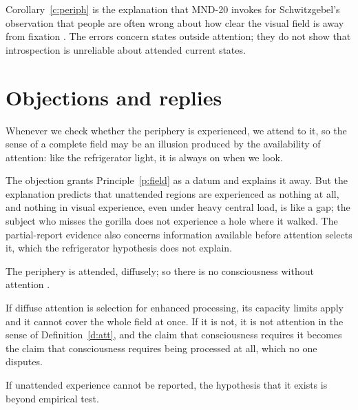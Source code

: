 \documentclass{situationist-preprint}
\begin{document}
Corollary~\ref{c:periph} is the explanation that MND-20 invokes for Schwitzgebel's observation that people are often wrong about how clear the visual field is away from fixation \citep{Schwitzgebel2008}. The errors concern states outside attention; they do not show that introspection is unreliable about attended current states.

\section{Objections and replies}

\begin{objection}\label{o:fridge}
Whenever we check whether the periphery is experienced, we attend to it, so the sense of a complete field may be an illusion produced by the availability of attention: like the refrigerator light, it is always on when we look.
\end{objection}

\begin{reply}
The objection grants Principle~\ref{p:field} as a datum and explains it away. But the explanation predicts that unattended regions are experienced as nothing at all, and nothing in visual experience, even under heavy central load, is like a gap; the subject who misses the gorilla does not experience a hole where it walked. The partial-report evidence also concerns information available before attention selects it, which the refrigerator hypothesis does not explain.
\end{reply}

\begin{objection}\label{o:diffuse}
The periphery is attended, diffusely; so there is no consciousness without attention \citep{Prinz2012}.
\end{objection}

\begin{reply}
If diffuse attention is selection for enhanced processing, its capacity limits apply and it cannot cover the whole field at once. If it is not, it is not attention in the sense of Definition~\ref{d:att}, and the claim that consciousness requires it becomes the claim that consciousness requires being processed at all, which no one disputes.
\end{reply}

\begin{objection}[Unfalsifiability]\label{o:falsi}
If unattended experience cannot be reported, the hypothesis that it exists is beyond empirical test.
\end{objection}
\end{document}
